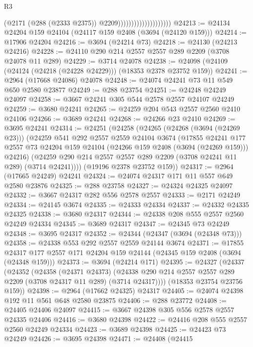 \begin{lexlean}{R3}
\begin{coremodule}
                                          (@2171 (@288 (@2333 @2375)) @2209))))))))))))))))))))
@24213 := @24134 @24204 @159 @24104 (@24117 @159 @2408 (@3694 (@24120 @159)))
@24214 := @17906 @24204
@24216 := @3694 (@24214 @73)
@24218 := @24130 (@24213 @24216)
@24228 := @24110 @290 @214 @2557 @2557 @289 @2209 (@3708 @24078 @11 @289)
@24229 := @3714 @24078
@24238 := @24098 (@24109 (@24124 (@24218 (@24228 @24229))) (@18353 @2378 @23752 @159))
@24241 := @2964 (@17668 @24086) @24078
@24248 := @24074 @24241 @73 @11 @549 @650 @2580 @23877
@24249 := @288 @23754
@24251 := @24248 @24249 @24097
@24258 := @3667 @24241 @305 @544 @2578 @2557 @24107 @24249
@24259 := @3680 @24241
@24265 := @24259 @204 @543 @2557 @2560 @2410 @24106
@24266 := @3689 @24241
@24268 := @24266 @23 @2410
@24269 := @3695 @24241
@24314 := @24251
    (@24258
      (@24265
        (@24268 (@3694 (@24269 @23)))
        (@24259
          @541
          @292
          @2557
          @2559
          @24104
          @3674
          (@17855
            @24241
            @177
            @2557
            @73
            @24204
            @159
            @24104
            (@24266 @159 @2408 (@3694 (@24269 @159)))
            @24216)
          (@24259 @290 @214 @2557 @2557 @289 @2209 (@3708 @24241 @11 @289) (@3714 @24241))))
      (@19196 @2378 @23752 @159))
@24317 := @2964 (@17665 @24249) @24241
@24324 := @24074 @24317 @171 @11 @557 @649 @2580 @23876
@24325 := @288 @23758
@24327 := @24324 @24325 @24097
@24332 := @3667 @24317 @282 @556 @2578 @2557
@24333 := @2171 @24249
@24334 := @24145 @3674
@24335 := @24333 @24334
@24337 := @24332 @24335 @24325
@24338 := @3680 @24317
@24344 := @24338 @208 @555 @2557 @2560 @24249 @24334
@24345 := @3689 @24317
@24347 := @24345 @73 @24249
@24348 := @3695 @24317
@24352 := @24344 (@24347 (@3694 (@24348 @73)))
@24358 := @24338 @553 @292 @2557 @2559 @24144 @3674
@24371 := @17855 @24317 @177 @2557 @171 @24204 @159 @24144 (@24345 @159 @2408 (@3694 (@24348 @159)))
@24373 := @3694 (@24214 @171)
@24395 := @24327
    (@24337
      (@24352
        (@24358
          (@24371 @24373)
          (@24338 @290 @214 @2557 @2557 @289 @2209 (@3708 @24317 @11 @289) (@3714 @24317))))
      (@18353 @23754 @23756 @159))
@24398 := @2964 (@17662 @24325) @24317
@24405 := @24074 @24398 @192 @11 @561 @648 @2580 @23875
@24406 := @288 @23772
@24408 := @24405 @24406 @24097
@24415 := @3667 @24398 @305 @556 @2578 @2557 @24335 @24406
@24416 := @3680 @24398
@24422 := @24416 @208 @555 @2557 @2560 @24249 @24334
@24423 := @3689 @24398
@24425 := @24423 @73 @24249
@24426 := @3695 @24398
@24471 := @24408
    (@24415

\end{coremodule}
\end{lexlean}
